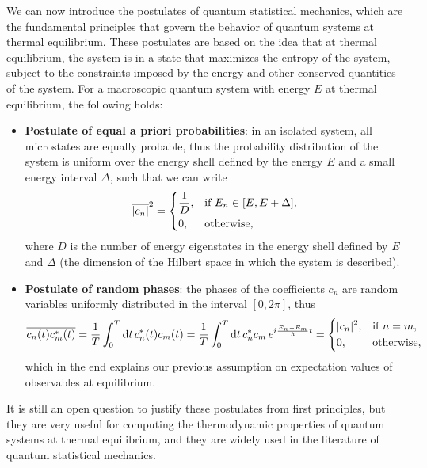We can now introduce the postulates of quantum statistical mechanics, which are the fundamental principles that govern the behavior of quantum systems at thermal equilibrium. These postulates are based on the idea that at thermal equilibrium, the system is in a state that maximizes the entropy of the system, subject to the constraints imposed by the energy and other conserved quantities of the system. For a macroscopic quantum system with energy \(E\) at thermal equilibrium, the following holds:
\begin{itemize}
    \item \textbf{Postulate of equal a priori probabilities}: in an isolated system, all microstates are equally probable, thus the probability distribution of the system is uniform over the energy shell defined by the energy \(E\) and a small energy interval \(\Delta\), such that we can write
          \[
              \overline{\vert c_n \vert}^2 = \begin{dcases}
                  \frac{1}{D}, & \text{if } E_n \in [E, E + \Delta], \\
                  0,           & \text{otherwise},
              \end{dcases}
          \]
          where \(D\) is the number of energy eigenstates in the energy shell defined by \(E\) and \(\Delta\) (the dimension of the Hilbert space in which the system is described).

    \item \textbf{Postulate of random phases}: the phases of the coefficients \(c_n\) are random variables uniformly distributed in the interval \([0, 2\pi]\), thus
          \[
              \overline{c_n(t) c_m^*(t)} = \frac{1}{T} \int_0^T \mathrm{d}t \, c_n^*(t) c_m(t) = \frac{1}{T}  \int_0^T \mathrm{d}t \, c_n^* c_m \, e^{i \frac{E_n - E_m}{\hbar} t} = \begin{dcases}
                  \vert c_n \vert^2, & \text{if } n = m, \\
                  0,                 & \text{otherwise},
              \end{dcases}
          \]
          which in the end explains our previous assumption on expectation values of observables at equilibrium.
\end{itemize}

It is still an open question to justify these postulates from first principles, but they are very useful for computing the thermodynamic properties of quantum systems at thermal equilibrium, and they are widely used in the literature of quantum statistical mechanics.

